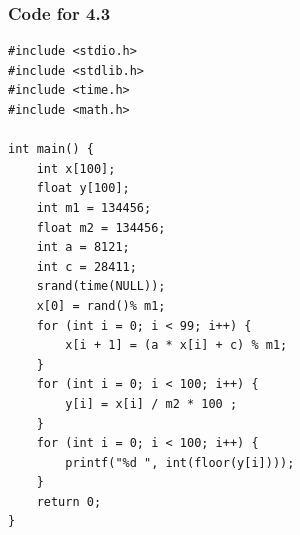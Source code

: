 \documentclass[a4paper]{article}
\begin{document}
	\subsubsection{Code for 4.3}

\lstset{language=C}
\begin{lstlisting}
#include <stdio.h>
#include <stdlib.h>
#include <time.h>
#include <math.h>

int main() {
	int x[100];
	float y[100];
	int m1 = 134456;
	float m2 = 134456;
	int a = 8121;
	int c = 28411;
	srand(time(NULL));
	x[0] = rand()% m1;
	for (int i = 0; i < 99; i++) {
		x[i + 1] = (a * x[i] + c) % m1;
	}
	for (int i = 0; i < 100; i++) {
		y[i] = x[i] / m2 * 100 ;
	}
	for (int i = 0; i < 100; i++) {
		printf("%d ", int(floor(y[i])));
	}
	return 0;
}
\end{lstlisting}
\end{document}
